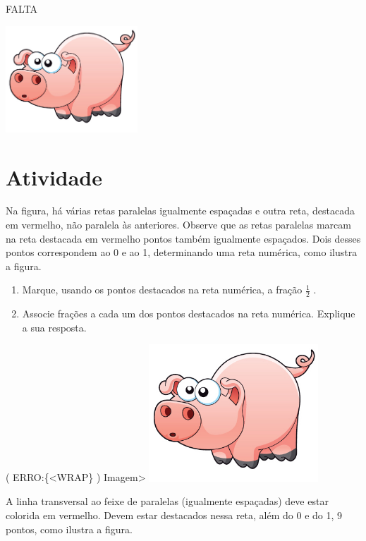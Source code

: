 \documentclass[a4,12pt]{book}
\begin{document}
FALTA





\includegraphics[width=\textwidth,height=4cm, keepaspectratio]{pig}
\section{Atividade}







Na figura, há várias retas paralelas igualmente espaçadas e outra reta, destacada em vermelho, não paralela às anteriores. Observe que as retas paralelas marcam na reta destacada em vermelho pontos também igualmente espaçados. Dois desses pontos correspondem ao 0 e ao 1, determinando uma reta numérica, como ilustra a figura.

\begin{enumerate} [\quad a)] %
  \item     Marque, usando os pontos destacados na reta numérica, a fração     $\frac{1}{2}$    .
  \item     Associe frações a cada um dos pontos destacados na reta numérica. Explique a sua resposta.
\end{enumerate} %


( ERRO:\{<WRAP\} ) Imagem>
\includegraphics[width=180pt, keepaspectratio]{pig}


A linha transversal ao feixe de paralelas (igualmente espaçadas) deve estar colorida em vermelho. Devem estar destacados nessa reta, além do 0 e do 1, 9 pontos, como ilustra a figura.
\end{document}
